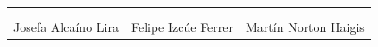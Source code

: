 \vspace{1.5cm}
\noindent
\begin{tabular}{p{4.6cm}p{4.6cm}p{4.6cm}}
    \vspace{2cm} & \vspace{2cm} & \vspace{2cm} \\
    \hrulefill & \hrulefill & \hrulefill \\
    Josefa Alcaíno Lira & Felipe Izcúe Ferrer & Martín Norton Haigis \\
\end{tabular}
